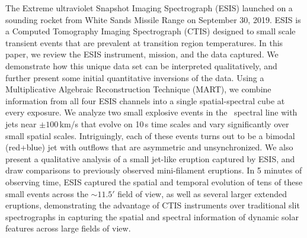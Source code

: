 The Extreme ultraviolet Snapshot Imaging Spectrograph (ESIS) launched on a sounding rocket from White Sands Missile Range on September 30, 2019.
ESIS is a Computed Tomography Imaging Spectrograph (CTIS) designed to %
  small scale transient events that are prevalent at transition region temperatures.
In this paper, we review the ESIS instrument, mission, and the data captured.
We demonstrate how this unique data set can be interpreted qualitatively, and further present some initial quantitative inversions of the data.
Using a Multiplicative Algebraic Reconstruction Technique (MART), we combine information from all four ESIS channels into a single spatial-spectral cube at every exposure.
We analyze two small explosive events in the \ov \ spectral line with jets near $\pm 100$\,km/s that evolve on 10\,s time scales and vary significantly over small spatial scales. Intriguingly, each of these events turns out to be a bimodal (red+blue) jet with outflows that are asymmetric and unsynchronized.
We also present a qualitative analysis of a small jet-like eruption captured by ESIS, and draw comparisons to previously observed mini-filament eruptions.
In 5 minutes of observing time, ESIS captured the spatial and temporal evolution of tens of these small events across the $\sim 11.5'$ field of view, as well as several larger extended eruptions, demonstrating the advantage of CTIS instruments over traditional slit spectrographs in capturing the spatial and spectral information of dynamic solar features across large fields of view.